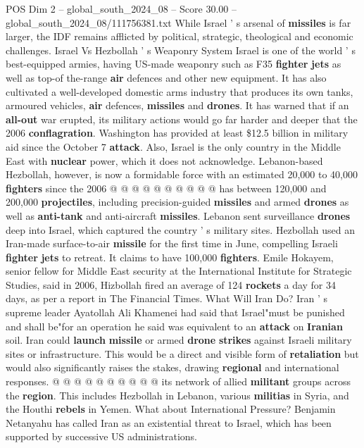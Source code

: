 \begin{textsample}{POS Dim 2 – global\_south\_2024\_08 – Score 30.00 – global\_south\_2024\_08/111756381.txt}
While Israel ' s arsenal of \textbf{missiles} is far larger, the IDF remains afflicted by political, strategic, theological and economic challenges.
Israel Vs Hezbollah ' s Weaponry System Israel is one of the world ' s best-equipped armies, having US-made weaponry such as F35 \textbf{fighter} \textbf{jets} as well as top-of the-range \textbf{air} defences and other new equipment.
It has also cultivated a well-developed domestic arms industry that produces its own tanks, armoured vehicles, \textbf{air} defences, \textbf{missiles} and \textbf{drones}.
It has warned that if an \textbf{all-out} war erupted, its military actions would go far harder and deeper that the 2006 \textbf{conflagration}.
Washington has provided at least \$12.5 billion in military aid since the October 7 \textbf{attack}.
Also, Israel is the only country in the Middle East with \textbf{nuclear} power, which it does not acknowledge.
Lebanon-based Hezbollah, however, is now a formidable force with an estimated 20,000 to 40,000 \textbf{fighters} since the 2006 @ @ @ @ @ @ @ @ @ @ has between 120,000 and 200,000 \textbf{projectiles}, including precision-guided \textbf{missiles} and armed \textbf{drones} as well as \textbf{anti-tank} and anti-aircraft \textbf{missiles}.
Lebanon sent surveillance \textbf{drones} deep into Israel, which captured the country ' s military sites.
Hezbollah used an Iran-made surface-to-air \textbf{missile} for the first time in June, compelling Israeli \textbf{fighter} \textbf{jets} to retreat.
It claims to have 100,000 \textbf{fighters}.
Emile Hokayem, senior fellow for Middle East security at the International Institute for Strategic Studies, said in 2006, Hizbollah fired an average of 124 \textbf{rockets} a day for 34 days, as per a report in The Financial Times.
What Will Iran Do?
Iran ' s supreme leader Ayatollah Ali Khamenei had said that Israel"must be punished and shall be"for an operation he said was equivalent to an \textbf{attack} on \textbf{Iranian} soil.
Iran could \textbf{launch} \textbf{missile} or armed \textbf{drone} \textbf{strikes} against Israeli military sites or infrastructure.
This would be a direct and visible form of \textbf{retaliation} but would also significantly raises the stakes, drawing \textbf{regional} and international responses. @ @ @ @ @ @ @ @ @ @ its network of allied \textbf{militant} groups across the \textbf{region}.
This includes Hezbollah in Lebanon, various \textbf{militias} in Syria, and the Houthi \textbf{rebels} in Yemen.
What about International Pressure?
Benjamin Netanyahu has called Iran as an existential threat to Israel, which has been supported by successive US administrations.

\end{textsample}
